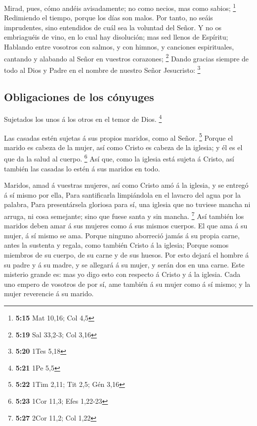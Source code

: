 Mirad, pues, cómo andéis avisadamente; no como necios,
mas como sabios; \footnote{\textbf{5:15} Mat 10,16; Col 4,5}
 Redimiendo el tiempo, porque los días son malos.
 Por tanto, no seáis imprudentes, sino entendidos de cuál
sea la voluntad del Señor.  Y no os embriaguéis de vino,
en lo cual hay disolución; mas sed llenos de Espíritu; 
Hablando entre vosotros con salmos, y con himnos, y canciones
espirituales, cantando y alabando al Señor en vuestros corazones;
\footnote{\textbf{5:19} Sal 33,2-3; Col 3,16}  Dando
gracias siempre de todo al Dios y Padre en el nombre de nuestro Señor
Jesucristo: \footnote{\textbf{5:20} 1Tes 5,18}

\hypertarget{obligaciones-de-los-cuxf3nyuges}{%
\subsection{Obligaciones de los
cónyuges}\label{obligaciones-de-los-cuxf3nyuges}}

 Sujetados los unos á los otros en el temor de Dios.
\footnote{\textbf{5:21} 1Pe 5,5}

 Las casadas estén sujetas á sus propios maridos, como al
Señor. \footnote{\textbf{5:22} 1Tim 2,11; Tit 2,5; Gén 3,16}
 Porque el marido es cabeza de la mujer, así como Cristo
es cabeza de la iglesia; y él es el que da la salud al cuerpo.
\footnote{\textbf{5:23} 1Cor 11,3; Efes 1,22-23}  Así
que, como la iglesia está sujeta á Cristo, así también las casadas lo
estén á sus maridos en todo.

 Maridos, amad á vuestras mujeres, así como Cristo amó á
la iglesia, y se entregó á sí mismo por ella,  Para
santificarla limpiándola en el lavacro del agua por la palabra,
 Para presentársela gloriosa para sí, una iglesia que no
tuviese mancha ni arruga, ni cosa semejante; sino que fuese santa y sin
mancha. \footnote{\textbf{5:27} 2Cor 11,2; Col 1,22}  Así
también los maridos deben amar á sus mujeres como á sus mismos cuerpos.
El que ama á su mujer, á sí mismo se ama.  Porque ninguno
aborreció jamás á su propia carne, antes la sustenta y regala, como
también Cristo á la iglesia;  Porque somos miembros de su
cuerpo, de su carne y de sus huesos.  Por esto dejará el
hombre á su padre y á su madre, y se allegará á su mujer, y serán dos en
una carne.  Este misterio grande es: mas yo digo esto con
respecto á Cristo y á la iglesia.  Cada uno empero de
vosotros de por sí, ame también á su mujer como á sí mismo; y la mujer
reverencie á su marido.

